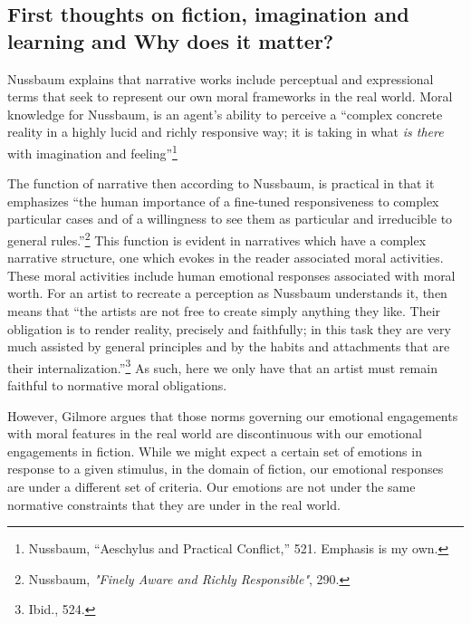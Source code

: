 \documentclass[phdthesis,12pt,final]{wuthesis}
\theoremstyle{definition}
\theoremstyle{definition}
\theoremstyle{definition}
\theoremstyle{definition}
\theoremstyle{remark}
\begin{document}
\subsection*{First thoughts on fiction, imagination and learning and Why does it matter?}\label{first-thoughts-on-fiction-imagination-and-learning-and-why-does-it-matter}

Nussbaum explains that narrative works include perceptual and expressional terms that seek to represent our own moral frameworks in the real world. Moral knowledge for Nussbaum, is an agent's ability to perceive a ``complex concrete reality in a highly lucid and richly responsive way; it is taking in what \emph{is there} with imagination and feeling''\footnote{Nussbaum, {``Aeschylus and Practical Conflict,''} 521. Emphasis is my own.}

The function of narrative then according to Nussbaum, is practical in that it emphasizes ``the human importance of a fine-tuned responsiveness to complex particular cases and of a willingness to see them as particular and irreducible to general rules.''\footnote{Nussbaum, \emph{"{Finely Aware} and {Richly Responsible}"}, 290.} This function is evident in narratives which have a complex narrative structure, one which evokes in the reader associated moral activities. These moral activities include human emotional responses associated with moral worth. For an artist to recreate a perception as Nussbaum understands it, then means that ``the artists are not free to create simply anything they like. Their obligation is to render reality, precisely and faithfully; in this task they are very much assisted by general principles and by the habits and attachments that are their internalization.''\footnote{Ibid., 524.} As such, here we only have that an artist must remain faithful to normative moral obligations.

However, Gilmore argues that those norms governing our emotional engagements with moral features in the real world are discontinuous with our emotional engagements in fiction. While we might expect a certain set of emotions in response to a given stimulus, in the domain of fiction, our emotional responses are under a different set of criteria. Our emotions are not under the same normative constraints that they are under in the real world.
\end{document}
